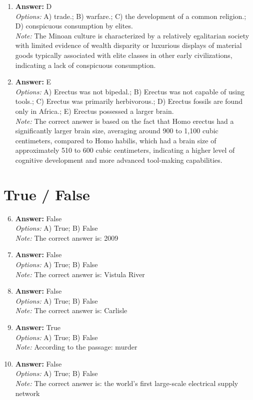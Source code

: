 \documentclass[12pt]{article}
\begin{document}
\begin{enumerate}[label=\arabic*.]
\item \textbf{Answer:} D
\\ \textit{Options:} A) trade.; B) warfare.; C) the development of a common religion.; D) conspicuous consumption by elites.
\\ \textit{Note:} The Minoan culture is characterized by a relatively egalitarian society with limited evidence of wealth disparity or luxurious displays of material goods typically associated with elite classes in other early civilizations, indicating a lack of conspicuous consumption.
\item \textbf{Answer:} E
\\ \textit{Options:} A) Erectus was not bipedal.; B) Erectus was not capable of using tools.; C) Erectus was primarily herbivorous.; D) Erectus fossils are found only in Africa.; E) Erectus possessed a larger brain.
\\ \textit{Note:} The correct answer is based on the fact that Homo erectus had a significantly larger brain size, averaging around 900 to 1,100 cubic centimeters, compared to Homo habilis, which had a brain size of approximately 510 to 600 cubic centimeters, indicating a higher level of cognitive development and more advanced tool-making capabilities.
\end{enumerate}

\section*{True / False}
\begin{enumerate}[label=\arabic*.]
\setcounter{enumi}{5}
\item \textbf{Answer:} False
\\ \textit{Options:} A) True; B) False
\\ \textit{Note:} The correct answer is: 2009
\item \textbf{Answer:} False
\\ \textit{Options:} A) True; B) False
\\ \textit{Note:} The correct answer is: Vistula River
\item \textbf{Answer:} False
\\ \textit{Options:} A) True; B) False
\\ \textit{Note:} The correct answer is: Carlisle
\item \textbf{Answer:} True
\\ \textit{Options:} A) True; B) False
\\ \textit{Note:} According to the passage: murder
\item \textbf{Answer:} False
\\ \textit{Options:} A) True; B) False
\\ \textit{Note:} The correct answer is: the world's first large-scale electrical supply network
\end{enumerate}
\end{document}
